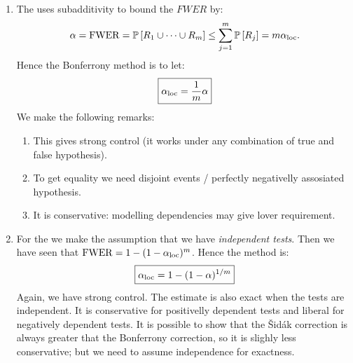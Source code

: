 \begin{enumerate}
    \item The  uses subadditivity to bound the $FWER$ by:
    $$
        \alpha = \mathrm{FWER} = \mathbb{P}\left[R_1\cup\dots\cup R_m\right] \leq \sum_{j=1}^m \mathbb{P}\left[R_j\right] = m \alpha_{\mathrm{loc}}.
    $$
    Hence the Bonferrony method is to let:
    \begin{equation}
        \boxed{\alpha_{\mathrm{loc}} = \frac{1}{m} \alpha}
    \end{equation}
    We make the following remarks:
    \begin{enumerate}
        \item This gives strong control (it works under any combination of true and false hypothesis).
        \item To get equality we need disjoint events / perfectly negativelly assosiated hypothesis.
        \item It is conservative: modelling dependencies may give lover requirement.
    \end{enumerate}
    \item For the  we make the assumption that we have \emph{independent tests}. Then we have seen that $\mathrm{FWER} = 1-(1-\alpha_{\mathrm{loc}})^m$. Hence the method is:
    \begin{equation}
        \boxed{\alpha_{\mathrm{loc}} = 1-(1-\alpha)^{1/m}}
    \end{equation}
    Again, we have strong control. The estimate is also exact when the tests are independent. It is conservative for positivelly dependent tests and liberal for negatively dependent tests. It is possible to show that the Šidák correction is always greater that the Bonferrony correction, so it is slighly less conservative; but we need to assume independence for exactness. 
\end{enumerate}

